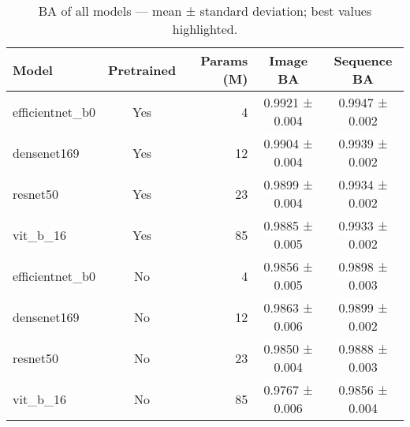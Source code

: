 \begin{table}[ht]
\centering
\caption{\acs{BA} of all models --- mean ± standard deviation; best values highlighted.}
\label{tab:bal_acc_by_model}
\begin{tabular}{l c r c c}
\toprule
Model & Pretrained & Params (M) & Image \acs{BA} & Sequence \acs{BA} \\
\midrule
efficientnet\_b0 & Yes & 4 & \colorbox{gray!20}{0.9921} ± 0.004 & \colorbox{gray!20}{0.9947} ± 0.002 \\
densenet169 & Yes & 12 & \colorbox{white}{0.9904} ± 0.004 & \colorbox{white}{0.9939} ± 0.002 \\
resnet50 & Yes & 23 & \colorbox{white}{0.9899} ± 0.004 & \colorbox{white}{0.9934} ± 0.002 \\
vit\_b\_16 & Yes & 85 & \colorbox{white}{0.9885} ± 0.005 & \colorbox{white}{0.9933} ± 0.002 \\
\midrule
efficientnet\_b0 & No & 4 & \colorbox{white}{0.9856} ± 0.005 & \colorbox{white}{0.9898} ± 0.003 \\
densenet169 & No & 12 & \colorbox{white}{0.9863} ± 0.006 & \colorbox{white}{0.9899} ± 0.002 \\
resnet50 & No & 23 & \colorbox{white}{0.9850} ± 0.004 & \colorbox{white}{0.9888} ± 0.003 \\
vit\_b\_16 & No & 85 & \colorbox{white}{0.9767} ± 0.006 & \colorbox{white}{0.9856} ± 0.004 \\
\bottomrule
\end{tabular}
\end{table}